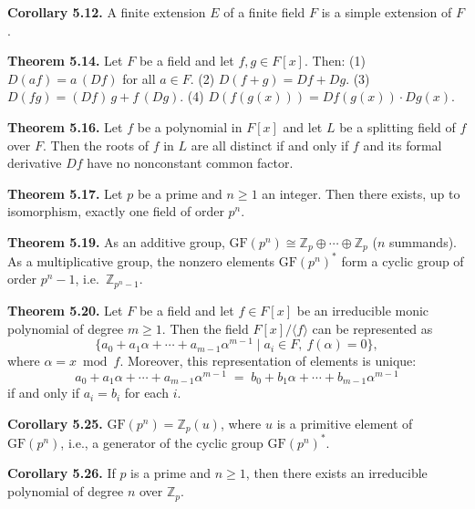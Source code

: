 \documentclass{article}
\newenvironment{theoremx}[1]{\noindent\textbf{Theorem #1.} }{\par}
\newenvironment{corollaryx}[1]{\noindent\textbf{Corollary #1.} }{\par}
\begin{document}
\begin{corollaryx}{5.12}
A finite extension $E$ of a finite field $F$ is a simple extension of $F$.
\end{corollaryx}

\begin{theoremx}{5.14}
Let $F$ be a field and let $f,g \in F[x]$.  Then:
(1) $D(af) = a\,(Df)$ for all $a\in F$.
(2) $D(f+g)=Df+Dg$.
(3) $D(fg)=(Df)\,g+f\,(Dg)$.
(4) $D(f(g(x))) = Df(g(x))\cdot Dg(x)$.
\end{theoremx}

\begin{theoremx}{5.16}
Let $f$ be a polynomial in $F[x]$ and let $L$ be a splitting field of $f$ over $F$.  Then the roots of $f$ in $L$ are all distinct if and only if $f$ and its formal derivative $Df$ have no nonconstant common factor.
\end{theoremx}

\begin{theoremx}{5.17}
Let $p$ be a prime and $n\ge1$ an integer.  Then there exists, up to isomorphism, exactly one field of order $p^n$.
\end{theoremx}

\begin{theoremx}{5.19}
As an additive group, $\mathrm{GF}(p^n)\cong \mathbb{Z}_p\oplus \cdots \oplus \mathbb{Z}_p$ ($n$ summands).  As a multiplicative group, the nonzero elements $\mathrm{GF}(p^n)^*$ form a cyclic group of order $p^n-1$, i.e.\ $\mathbb{Z}_{p^n-1}$.
\end{theoremx}

\begin{theoremx}{5.20}
Let $F$ be a field and let $f\in F[x]$ be an irreducible monic polynomial of degree $m\ge1$.  Then the field $F[x]/\langle f\rangle$ can be represented as
\[
  \{a_0 + a_1\alpha + \cdots + a_{m-1}\alpha^{m-1} \mid a_i \in F,\ f(\alpha)=0\},
\]
where $\alpha = x \bmod f$.  Moreover, this representation of elements is unique: 
\[
  a_0 + a_1\alpha + \cdots + a_{m-1}\alpha^{m-1}
  \;=\;
  b_0 + b_1\alpha + \cdots + b_{m-1}\alpha^{m-1}
\]
if and only if $a_i=b_i$ for each $i$.
\end{theoremx}

\begin{corollaryx}{5.25}
$\mathrm{GF}(p^n) = \mathbb{Z}_p(u)$, where $u$ is a primitive element of $\mathrm{GF}(p^n)$, i.e., a generator of the cyclic group $\mathrm{GF}(p^n)^*$.
\end{corollaryx}

\begin{corollaryx}{5.26}
If $p$ is a prime and $n\ge1$, then there exists an irreducible polynomial of degree $n$ over $\mathbb{Z}_p$.
\end{corollaryx}
\end{document}
